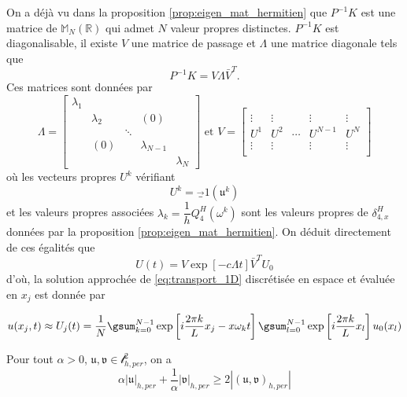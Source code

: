 On a déjà vu dans la proposition \ref{prop:eigen_mat_hermitien} que $P^{-1}K$ est une matrice de $\mathbb{M}_N(\mathbb{R})$ qui admet $N$ valeur propres distinctes. $P^{-1}K$ est diagonalisable, il existe $V$ une matrice de passage et $\Lambda$ une matrice diagonale tels que 
\begin{equation}
P^{-1}K = V \Lambda \bar{V}^T.
\end{equation}
Ces matrices sont données par 
\begin{equation}
\Lambda = \begin{bmatrix}
\lambda_1 &   &   &   &   \\ 
  & \lambda_2 &   & (0) &   \\ 
  &   & \ddots &   &   \\ 
  & (0) &   & \lambda_{N-1} &   \\ 
  &   &   &   & \lambda_N
\end{bmatrix} \text{ et }
V = \begin{bmatrix}
  &   &   &   &   \\ 
\vdots & \vdots  &   & \vdots  & \vdots  \\ 
U^1 & U^2 & \cdots & U^{N-1} & U^N \\ 
\vdots &\vdots &  &\vdots &\vdots \\ 
  &   &   &   &  
\end{bmatrix} 
\label{eq:matrice_diagonalisation}
\end{equation}
où les vecteurs propres $U^k$ vérifiant
\begin{equation}
U^k = \vec_1 ( \mathfrak{u}^k )
\end{equation} 
et les valeurs propres associées $\lambda_k = \dfrac{1}{h}Q_{4}^H(\omega^k)$ sont les valeurs propres de $\delta_{4,x}^H$ données par la proposition \ref{prop:eigen_mat_hermitien}. On déduit directement de ces égalités que 
\begin{equation}
U(t) = V \exp \left[-c \Lambda t \right] \bar{V}^T U_0
\end{equation}
d'où, la solution approchée de \eqref{eq:transport_1D} discrétisée en espace et évaluée en $x_j$ est donnée par 

\begin{equation}
u(x_j, t) \approx U_j ( t ) = \dfrac{1}{N} \gsum_{k=0}^{N-1}  \exp \left[ i \dfrac{2 \pi k}{L} x_j - x \omega_k t \right] \gsum_{l=0}^{N-1} \exp \left[ i \dfrac{2 \pi k}{L} x_l \right] u_0 (x_l)
\end{equation}




\begin{lemme}
Pour tout $\alpha > 0$, $\mathfrak{u}, \mathfrak{v} \in \mathcal{l}^2_{h,per}$, on a
\begin{equation}
\alpha |\mathfrak{u}|_{h,per} + \dfrac{1}{\alpha} |\mathfrak{v}|_{h,per} \geq 2 |(\mathfrak{u},\mathfrak{v})_{h,per}|
\end{equation}
\label{lem:ineg_1}
\end{lemme}

